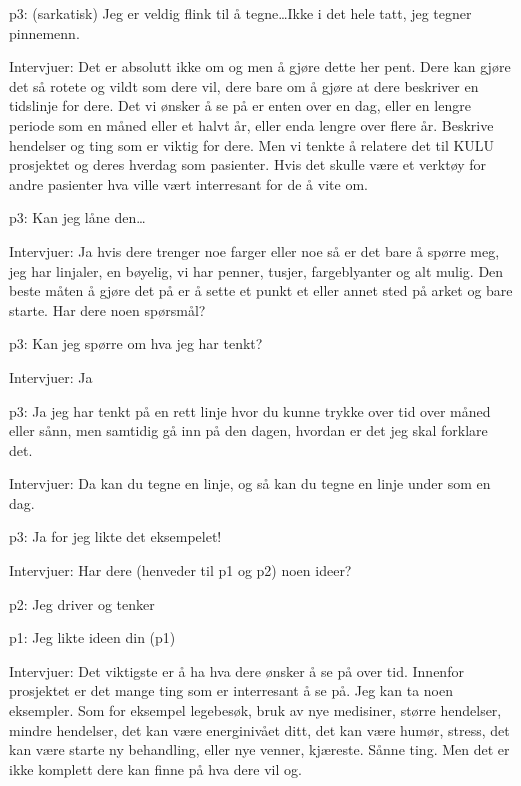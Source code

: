 \documentclass[11pt,UKenglish, a4paper]{article}
\begin{document}
\textcolor{myR} {p3:} (sarkatisk) Jeg er veldig flink til å tegne\dots Ikke i det hele tatt, jeg tegner pinnemenn. 

\textcolor{myBlue} {Intervjuer:} Det er absolutt ikke om og men å gjøre dette her pent. Dere kan gjøre det så rotete og vildt som dere vil, dere bare om å gjøre at dere beskriver en tidslinje for dere. Det vi ønsker å se på er enten over en dag, eller en lengre periode som en måned eller et halvt år, eller enda lengre over flere år. Beskrive hendelser og ting som er viktig for dere. Men vi tenkte å relatere det til KULU prosjektet og deres hverdag som pasienter. Hvis det skulle være et verktøy for andre pasienter hva ville vært interresant for de å vite om.

\textcolor{myR} {p3:} Kan jeg låne den\dots

\textcolor{myBlue} {Intervjuer:} Ja hvis dere trenger noe farger eller noe så er det bare å spørre meg, jeg har linjaler, en bøyelig, vi har penner, tusjer, fargeblyanter og alt mulig. Den beste måten å gjøre det på er å sette et punkt et eller annet sted på arket og bare starte. Har dere noen spørsmål?

\textcolor{myR} {p3:} Kan jeg spørre om hva jeg har tenkt?

\textcolor{myBlue} {Intervjuer:} Ja

\textcolor{myR} {p3:} Ja jeg har tenkt på en rett linje hvor du kunne trykke over tid over måned eller sånn, men samtidig gå inn på den dagen, hvordan er det jeg skal forklare det. 

\textcolor{myBlue} {Intervjuer:} Da kan du tegne en linje, og så kan du tegne en linje under som en dag. 

\textcolor{myR} {p3:} Ja for jeg likte det eksempelet!

\textcolor{myBlue} {Intervjuer:} Har dere (henveder til p1 og p2) noen ideer?

\textcolor{myYellow} {p2:} Jeg driver og tenker

\textcolor{myGreen} {p1:} Jeg likte ideen din (p1)

\textcolor{myBlue} {Intervjuer:} Det viktigste er å ha hva dere ønsker å se på over tid. Innenfor prosjektet er det mange ting som er interresant å se på. Jeg kan ta noen eksempler. Som for eksempel legebesøk, bruk av nye medisiner, større hendelser, mindre hendelser, det kan være energinivået ditt, det kan være humør, stress, det kan være starte ny behandling, eller nye venner, kjæreste. Sånne ting. Men det er ikke komplett dere kan finne på hva dere vil og.
\end{document}
